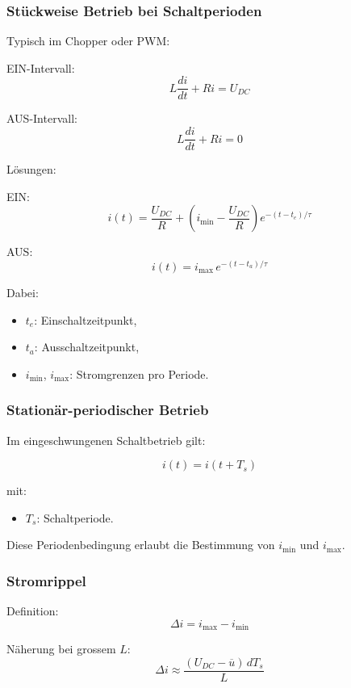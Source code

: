 
\subsubsection{Stückweise Betrieb bei Schaltperioden}

Typisch im Chopper oder PWM:

EIN-Intervall:
\[
L \frac{di}{dt} + R i = U_{DC}
\]

AUS-Intervall:
\[
L \frac{di}{dt} + R i = 0
\]

Lösungen:

EIN:
\[
\boxed{
i(t) = \frac{U_{DC}}{R} + \left( i_{\min} - \frac{U_{DC}}{R} \right) e^{-(t-t_e)/\tau}
}
\]

AUS:
\[
\boxed{
i(t) = i_{\max} \, e^{-(t-t_a)/\tau}
}
\]

Dabei:
\begin{itemize}
    \item $t_e$: Einschaltzeitpunkt,
    \item $t_a$: Ausschaltzeitpunkt,
    \item $i_{\min}$, $i_{\max}$: Stromgrenzen pro Periode.
\end{itemize}


\subsubsection{Stationär-periodischer Betrieb}

Im eingeschwungenen Schaltbetrieb gilt:

\[
\boxed{
i(t) = i(t + T_s)
}
\]

mit:
\begin{itemize}
    \item $T_s$: Schaltperiode.
\end{itemize}

Diese Periodenbedingung erlaubt die Bestimmung von $i_{\min}$ und $i_{\max}$.


\subsubsection{Stromrippel}

Definition:
\[
\boxed{
\Delta i = i_{\max} - i_{\min}
}
\]

Näherung bei grossem $L$:
\[
\boxed{
\Delta i \approx \frac{(U_{DC} - \overline{u}) \, d T_s}{L}
}
\]


